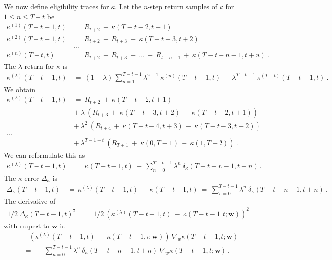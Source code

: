 \documentclass{article}
\newcommand\Bw{\bm{w}}
\renewcommand{\leq}{\leqslant}
\begin{document}
\begin{appendices}
We now define eligibility traces for $\kappa$.
Let the $n$-step return samples of $\kappa$ for $1\leq n \leq T-t$ be
\begin{align}
 \kappa^{(1)}(T-t-1,t) \ &= \  R_{t+2}  \ + \ \kappa(T-t-2,t+1)  \\ \nonumber
 \kappa^{(2)}(T-t-1,t) \ &= \  R_{t+2}  \ + \  R_{t+3}  \ + \ \kappa(T-t-3,t+2)  \\ \nonumber
 &\ldots \\ \nonumber
 \kappa^{(n)}(T-t,t) \ &= \  R_{t+2}  \ + \  R_{t+3}  \ + \ \ldots 
  \ + \  R_{t+n+1} \ + \ \kappa(T-t-n-1,t+n)  \ . 
\end{align}  
The $\lambda$-return for $\kappa$ is
\begin{align}
  \kappa^{(\lambda)} (T-t-1,t)\ &= \  (1 - \lambda) \  
  \sum_{n=1}^{T-t-1} \lambda^{n-1} \ \kappa^{(n)}(T-t-1,t)   \ + \ 
  \lambda^{T-t-1} \ \kappa^{(T-t)}(T-t-1,t)  \ . 
\end{align}  
We obtain
\begin{align}
  \kappa^{(\lambda)}(T-t-1,t) \ &= \  R_{t+2} \ + \ \kappa(T-t-2,t+1)  \\ \nonumber
  &+ \ \lambda \ \left(R_{t+3}  \ + \ \kappa(T-t-3,t+2) 
  \ - \ \kappa(T-t-2,t+1) \right) \\ \nonumber
  &+ \ \lambda^2 \ \left(R_{t+4}  \ + \ \kappa(T-t-4,t+3) 
  \ - \ \kappa(T-t-3,t+2) \right) \\ \nonumber
  \ldots \\ \nonumber
   &+ \ \lambda^{T-1-t} \ \left(R_{T+1}  \ + \ \kappa(0,T-1) 
  \ - \ \kappa(1,T-2) \right)  \ . 
\end{align}  
We can reformulate this as
\begin{align}
  \kappa^{(\lambda)}(T-t-1,t) \ &= \  \kappa(T-t-1,t) \ 
  + \ \sum_{n=0}^{T-t-1}  \lambda^{n} \  \delta_{\kappa}(T-t-n-1,t+n) \ .
\end{align}  
The $\kappa$ error $\Delta_{\kappa}$ is
\begin{align}
  \Delta_{\kappa}(T-t-1,t) \ &= \ \kappa^{(\lambda)}(T-t-1,t) \ - \  \kappa(T-t-1,t)  \
  = \ \sum_{n=0}^{T-t-1}  \lambda^{n} \  \delta_{\kappa}(T-t-n-1,t+n) \ .
\end{align}  
The derivative of 
\begin{align}
 1/2 \  \Delta_{\kappa}(T-t-1,t)^2 \ &= \ 1/2 \
 \left( \kappa^{(\lambda)}(T-t-1,t) \ - \  \kappa(T-t-1,t;\Bw) \right)^2  
\end{align}  
with respect to $\Bw$ is
\begin{align}
 &- \left(\kappa^{(\lambda)}(T-t-1,t) \ - \  \kappa(T-t-1,t;\Bw)  \right)
  \ \nabla_{w} \kappa(T-t-1,t;\Bw) \\ \nonumber 
  &= \
  - \ \sum_{n=0}^{T-t-1}  \lambda^{n} \  \delta_{\kappa}(T-t-n-1,t+n) \ 
  \nabla_{w} \kappa(T-t-1,t;\Bw) \ .
\end{align}  


\end{appendices}
\end{document}
